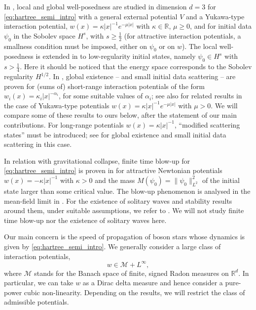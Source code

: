 \documentclass[12pt]{article}
\theoremstyle{plain}
\newcommand{\meas}{\mathcal{M}}
\begin{document}
In \cite{lenzmann_semirel}, local and global well-posedness are studied in dimension $d=3$ for \eqref{eq:hartree_semi_intro} with a general external potential $V$ and a Yukawa-type interaction potential, $w(x)=\kappa|x|^{-1}e^{-\mu|x|}$ with $\kappa\in\mathbb{R}$, $\mu\ge0$, and for initial data $\psi_0$ in the Sobolev space $H^s$, with $s\ge\frac12$ (for attractive interaction potentials, a smallness condition must be imposed, either on $\psi_0$ or on $w$). The local well-posedness is extended in \cite{HerrLenzmann} to low-regularity initial states, namely $\psi_0\in H^s$ with $s>\frac14$. Here it should be noticed that the energy space corresponds to the Sobolev regularity $H^{1/2}$. In \cites{ChoOzawa1,ChoOzawa2,ChoOzawaSazaki}, global existence -- and small initial data scattering -- are proven for (sums of) short-range interaction potentials of the form $w_i(x)=\kappa_i|x|^{-\alpha_i}$, for some suitable values of $\alpha_i$; see also \cite{HerrTesfahun} for related results in the case of Yukawa-type potentials $w(x)=\kappa|x|^{-1}e^{-\mu|x|}$ with $\mu>0$.   We will compare some of these results to ours  below, after the statement of our main contributions. For long-range potentials $w(x)=\kappa|x|^{-1}$, ``modified scattering states'' must be introduced; see \cite{Pusateri} for global existence and small initial data scattering in this case.

In relation with gravitational collapse, finite time blow-up for \eqref{eq:hartree_semi_intro} is proven in \cite{frohlich_lenzm07} for attractive Newtonian potentials $w(x)=-\kappa|x|^{-1}$ with $\kappa>0$ and the mass $M(\psi_0)=\|\psi_0\|_{L^2}^2$ of the initial state larger than some critical value. The blow-up phenomenon is analysed in the mean-field limit in \cite{MichelangeliSchlein}. For the existence of solitary waves and stability results around them, under suitable assumptions, we refer to \cites{FrohlichJonssonLenz1, FrohlichJonssonLenz2}. We will not study finite time blow-up nor the existence of solitary waves here.


Our main concern is the speed of propagation of boson stars whose dynamics is given by \eqref{eq:hartree_semi_intro}. We generally consider a large class of interaction potentials,
\begin{equation}\label{eq:w-general}
    w\in\meas +L^\infty,
\end{equation}
where $\meas $ stands for the Banach space of finite, signed Radon measures on $\mathbb{R}^d$. In particular, we can take $w$ as a Dirac delta measure and hence consider a pure-power cubic non-linearity. Depending on the results, we will restrict the class of admissible potentials.
\end{document}
